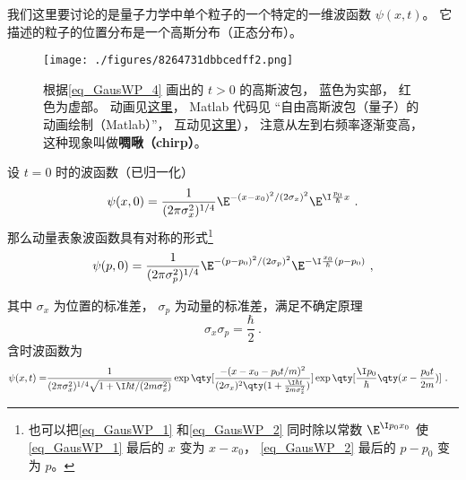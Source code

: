 
\begin{issues}
\issueAbstract
\issueTODO
\end{issues}



我们这里要讨论的是量子力学中单个粒子的一个特定的一维波函数 $\psi(x,t)$。 它描述的粒子的位置分布是一个高斯分布（正态分布）。

\begin{figure}[ht]
\centering
\texttt{[image: ./figures/8264731dbbcedff2.png]}
\caption{根据\autoref{eq_GausWP_4} 画出的 $t > 0$ 的高斯波包， 蓝色为实部， 红色为虚部。 动画见\href{https://wuli.wiki/apps/free_gauss.html}{这里}， Matlab 代码见 “自由高斯波包（量子）的动画绘制（Matlab）”， 互动见\href{https://wuli.wiki/apps/gausWP.html}{这里}）， 注意从左到右频率逐渐变高， 这种现象叫做\textbf{啁啾（chirp）}。} \label{fig_GausWP_1}
\end{figure}


设 $t = 0$ 时的波函数（已归一化）
\begin{equation}\label{eq_GausWP_1}
\psi (x,0) = \frac{1}{(2\pi\sigma_x ^2)^{1/4}} \E^{-(x - x_0)^2/(2\sigma_x)^2} \E^{\I \frac{p_0}{\hbar}x}~.
\end{equation}
那么动量表象波函数具有对称的形式\footnote{也可以把\autoref{eq_GausWP_1} 和\autoref{eq_GausWP_2} 同时除以常数 $\E^{\I p_0 x_0}$ 使\autoref{eq_GausWP_1} 最后的 $x$ 变为 $x-x_0$， \autoref{eq_GausWP_2} 最后的 $p-p_0$ 变为 $p$。 }%
\begin{equation}\label{eq_GausWP_2} %
\psi (p,0) = \frac{1}{(2\pi\sigma_p^2)^{1/4}} \E^{-(p - p_0)^2/(2\sigma_p)^2} \E^{-\I\frac{x_0}{\hbar }(p - p_0)}~,
\end{equation}

其中 $\sigma_x$ 为位置的标准差， $\sigma_p$ 为动量的标准差，满足不确定原理
\begin{equation} %
\sigma_x\sigma_p = \frac{\hbar}{2}~.
\end{equation}
含时波函数为
\begin{equation}\label{eq_GausWP_4}\begin{aligned} %
\psi (x,t) = &\frac{1}{(2\pi\sigma_x^2)^{1/4} \sqrt{1 + {\I\hbar t}/(2m \sigma_x^2)}}
\exp\qty[\frac{-(x - x_0 - p_0 t/m)^2}{(2\sigma_x )^2 \qty(1 + \frac{\I\hbar t}{2m \sigma_x^2})}] \exp\qty[\frac{\I p_0}{\hbar } \qty(x - \frac{p_0 t}{2m})]~.
\end{aligned}\end{equation}

